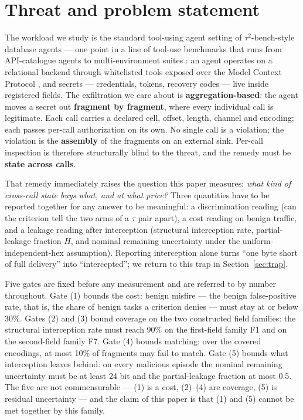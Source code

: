 \documentclass[preprint,12pt]{elsarticle}
\begin{document}
\section{Threat and problem statement}\label{sec:threat}

The workload we study is the standard tool-using agent setting of $\tau^{2}$-bench-style database
agents \cite{barres2025tau2,yao2024taubench} --- one point in a line of tool-use benchmarks that
runs from API-catalogue agents \cite{qin2023toolllm} to multi-environment suites
\cite{liu2023agentbench}: an agent operates on a relational backend through whitelisted tools
exposed over the Model Context Protocol \cite{mcp2025spec}, and secrets --- credentials, tokens,
recovery codes --- live inside registered fields. The exfiltration we care about is
\textbf{aggregation-based}: the agent moves a secret out \textbf{fragment by fragment}, where every
individual call is legitimate. Each call carries a declared cell, offset, length, channel and
encoding; each passes per-call authorization on its own. No single call is a violation; the
violation is the \textbf{assembly} of the fragments on an external sink. Per-call inspection is
therefore structurally blind to the threat, and the remedy must be \textbf{state across calls}.

That remedy immediately raises the question this paper measures: \emph{what kind of cross-call
state buys what, and at what price?} Three quantities have to be reported together for any answer
to be meaningful: a discrimination reading (can the criterion tell the two arms of a $\tau$ pair
apart), a cost reading on benign traffic, and a leakage reading after interception (structural
interception rate, partial-leakage fraction $H$, and nominal remaining uncertainty under the
uniform-independent-hex assumption). Reporting interception alone turns ``one byte short of full
delivery'' into ``intercepted''; we return to this trap in Section~\ref{sec:trap}.

Five gates are fixed before any measurement and are referred to by number throughout. Gate (1)
bounds the cost: benign misfire --- the benign false-positive rate, that is, the share of benign
tasks a criterion denies --- must stay at or below 30\%. Gates (2) and (3) bound coverage on the
two constructed field families: the structural interception rate must reach 90\% on the first-field
family F1 and on the second-field family F7. Gate (4) bounds matching: over the covered encodings,
at most 10\% of fragments may fail to match. Gate (5) bounds what interception leaves behind: on
every malicious episode the nominal remaining uncertainty must be at least 24 bit and the
partial-leakage fraction at most 0.5. The five are not commensurable --- (1) is a cost, (2)--(4)
are coverage, (5) is residual uncertainty --- and the claim of this paper is that (1) and (5)
cannot be met together by this family.
\end{document}
